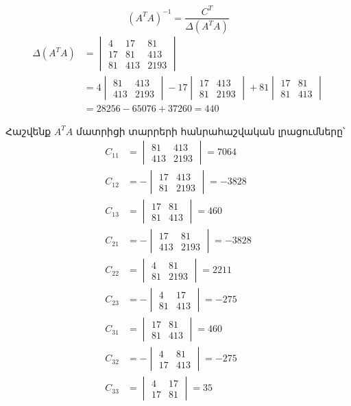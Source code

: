 \documentclass[12pt,a4paper]{article}
\numberwithin{equation}{section}
\numberwithin{figure}{section}
\begin{document}
\[
(A^T A)^{-1} = \frac{C^T}{\Delta(A^T A)}
\]
\begin{align*}
\Delta(A^T A) &=
\begin{vmatrix}
4 & 17 & 81 \\
17 & 81 & 413 \\
81 & 413 & 2193
\end{vmatrix} \\[8pt]
&= 4
\begin{vmatrix}
81 & 413 \\
413 & 2193
\end{vmatrix}
- 17
\begin{vmatrix}
17 & 413 \\
81 & 2193
\end{vmatrix}
+ 81
\begin{vmatrix}
17 & 81 \\
81 & 413
\end{vmatrix} \\[8pt]
&= 28256 - 65076 + 37260 = 440
\end{align*}

Հաշվենք $A^T A$ մատրիցի տարրերի հանրահաշվական լրացումները՝
\begin{align*}
C_{11} &=
\begin{vmatrix}
81 & 413 \\
413 & 2193
\end{vmatrix}
= 7064 \\[6pt]
C_{12} &= -
\begin{vmatrix}
17 & 413 \\
81 & 2193
\end{vmatrix}
= -3828 \\[6pt]
C_{13} &=
\begin{vmatrix}
17 & 81 \\
81 & 413
\end{vmatrix}
= 460 \\[6pt]
C_{21} &= -
\begin{vmatrix}
17 & 81 \\
413 & 2193
\end{vmatrix}
= -3828 \\[6pt]
C_{22} &=
\begin{vmatrix}
4 & 81 \\
81 & 2193
\end{vmatrix}
= 2211 \\[6pt]
C_{23} &= -
\begin{vmatrix}
4 & 17 \\
81 & 413
\end{vmatrix}
= -275 \\[6pt]
C_{31} &=
\begin{vmatrix}
17 & 81 \\
81 & 413
\end{vmatrix}
= 460 \\[6pt]
C_{32} &= -
\begin{vmatrix}
4 & 81 \\
17 & 413
\end{vmatrix}
= -275 \\[6pt]
C_{33} &=
\begin{vmatrix}
4 & 17 \\
17 & 81
\end{vmatrix}
= 35
\end{align*}
\end{document}

